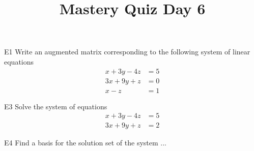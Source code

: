 \documentclass{sbgLAquiz}
\title{Mastery Quiz Day 6 }
\begin{document}
\begin{problem}{E1}
Write an augmented matrix corresponding to the following system of linear equations
\begin{align*}
x+3y-4z &= 5 \\
3x+9y+z &= 0 \\
x-z &= 1
\end{align*}
\end{problem}

\begin{problem}{E3}
Solve the system of equations
\begin{align*}
x+3y-4z &= 5 \\
3x+9y+z &= 2
\end{align*}
\end{problem}

\begin{problem}{E4}
Find a basis for the solution set of the system ...
\end{problem}
\end{document}
